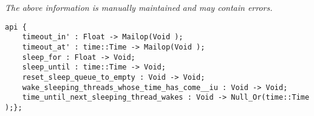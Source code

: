\label{pkg:timeout\_mailop}

{\tiny \it The above information is manually maintained and may contain errors.}
\begin{verbatim}
api {
    timeout_in' : Float -> Mailop(Void );
    timeout_at' : time::Time -> Mailop(Void );
    sleep_for : Float -> Void;
    sleep_until : time::Time -> Void;
    reset_sleep_queue_to_empty : Void -> Void;
    wake_sleeping_threads_whose_time_has_come__iu : Void -> Void;
    time_until_next_sleeping_thread_wakes : Void -> Null_Or(time::Time );};
\end{verbatim}
